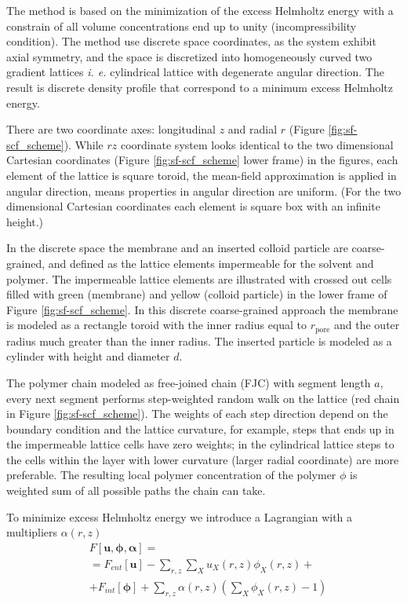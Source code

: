 \documentclass[10pt, a4paper]{article}
\begin{document}
\begin{multicols}{2}


The method is based on the minimization of the excess Helmholtz energy with a constrain of all volume concentrations end up to unity (incompressibility condition).
The method use discrete space coordinates, as the system exhibit axial symmetry, and the space is discretized into homogeneously curved two gradient lattices \emph{i. e.} cylindrical lattice with degenerate angular direction.
The result is discrete density profile that correspond to a minimum excess Helmholtz energy.

There are two coordinate axes: longitudinal $z$ and radial $r$ (Figure \ref{fig:sf-scf_scheme}). 
While $rz$ coordinate system looks identical to the two dimensional Cartesian coordinates (Figure \ref{fig:sf-scf_scheme} lower frame) in the figures, each element of the lattice is square toroid, the mean-field approximation is applied in angular direction, means properties in angular direction are uniform.
(For the two dimensional Cartesian coordinates each element is square box with an infinite height.)

In the discrete space the membrane and an inserted colloid particle are coarse-grained, and defined as the lattice elements impermeable for the solvent and polymer.
The impermeable lattice elements are illustrated with crossed out cells filled with green (membrane) and yellow (colloid particle) in  the lower frame of Figure \ref{fig:sf-scf_scheme}.
In this discrete coarse-grained approach the membrane is modeled as a rectangle toroid with the inner radius equal to $r_{\textrm{pore}}$ and the outer radius much greater than the inner radius.
The inserted particle is modeled as a cylinder with height and diameter $d$.

The polymer chain modeled as free-joined chain (FJC) with segment length $a$, every next segment performs step-weighted random walk on the lattice (red chain in Figure \ref{fig:sf-scf_scheme}).
The weights of each step direction depend on the boundary condition and the lattice curvature, for example, steps that ends up in the impermeable lattice cells have zero weights; in the cylindrical lattice steps to the cells within the layer with lower curvature (larger radial coordinate) are more preferable.
The resulting local polymer concentration of the polymer $\phi$ is weighted sum of all possible paths the chain can take.


To minimize excess Helmholtz energy we introduce a Lagrangian with a multipliers $\alpha(r,z)$
\begin{equation}
    \label{eq:fe_lagrangian}
    \begin{aligned}
    &F[\mathbf{u}, \boldsymbol{\phi}, \boldsymbol{\alpha}] =\\
    &= F_{ent}[\mathbf{u}] - \sum\limits_{r,z} \sum\limits_X u_X(r, z) \phi_X(r, z) + \\
    &+ F_{int} [\boldsymbol{\phi}] 
    + \sum\limits_{r,z} \alpha(r, z) \left( \sum\limits_X \phi_X(r, z) - 1 \right)
    \end{aligned} 
\end{equation}


\end{multicols}
\end{document}
